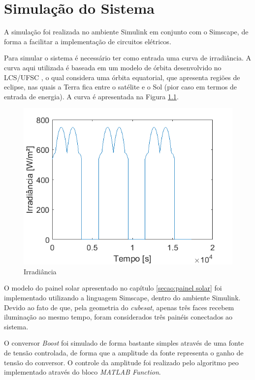 \chapter{Simulação do Sistema} \label{secao:simulacao_sistema}

A simulação foi realizada no ambiente Simulink em conjunto com o Simscape, de forma a facilitar a implementação de circuitos elétricos.

Para simular o sistema é necessário ter como entrada uma curva de irradiância. A curva aqui utilizada é baseada em um modelo de órbita desenvolvido no LCS/UFSC \cite{slongo2016}, o qual considera uma órbita equatorial, que apresenta regiões de eclipse, nas quais a Terra fica entre o satélite e o Sol (pior caso em termos de entrada de energia). A curva é apresentada na Figura \ref{figura_irradiancia_simulacao}.

\begin{figure}[!htpb]
\begin{center}
\includegraphics[scale=0.5]{figures/simulatedIrradiance.png}
\caption{Irradiância}
\label{figura_irradiancia_simulacao}
\end{center}
\end{figure}

O modelo do painel solar apresentado no capítulo \ref{secao:painel solar} foi implementado utilizando a linguagem Simscape, dentro do ambiente Simulink. Devido ao fato de que, pela geometria do \textit{cubesat}, apenas três faces recebem iluminação ao mesmo tempo, foram considerados três painéis conectados ao sistema.

O conversor \textit{Boost} foi simulado de forma bastante simples através de uma fonte de tensão controlada, de forma que a amplitude da fonte representa o ganho de tensão do conversor. O controle da amplitude foi realizado pelo algoritmo \gls{peo} implementado através do bloco \textit{MATLAB Function}.

